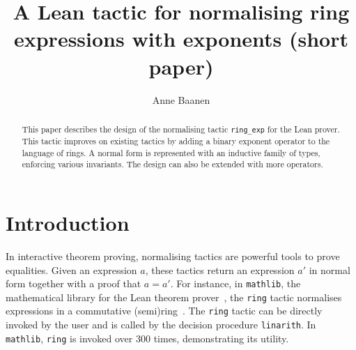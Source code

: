 \documentclass{llncs}
\title{A Lean tactic for normalising ring\\ expressions with exponents (short paper)}
\author{Anne Baanen}
\institute{Vrije Universiteit Amsterdam, Amsterdam, The Netherlands\\\email{t.baanen@vu.nl}}
\newcommand{\lean}[1]{\texttt{#1}\xspace} %
\newcommand{\mathlib}{\texttt{mathlib}\xspace}
\newcommand{\ring}{\lean{ring}}
\newcommand{\ringexp}{\lean{ring\_exp}}
\begin{document}
\maketitle

\begin{abstract}
This paper describes the design of the normalising tactic \ringexp for the Lean prover.
This tactic improves on existing tactics by adding a binary exponent operator to the language of rings.
A normal form is represented with an inductive family of types, enforcing various invariants.
The design can also be extended with more operators.
\end{abstract}

\section{Introduction}

In interactive theorem proving, normalising tactics are powerful tools to prove equalities.
Given an expression $a$, these tactics return an expression $a'$ in normal form together with a proof that $a = a'$.
For instance, in \mathlib, the mathematical library for the Lean theorem prover~\cite{lean-prover},
the \lean{ring} tactic normalises %
expressions in a commutative (semi)ring~\cite{mathlib}.
The \ring tactic can be directly invoked by the user
and is called by the decision procedure \lean{linarith}.
In \mathlib, \ring is invoked over 300 times, demonstrating its utility.
\end{document}
